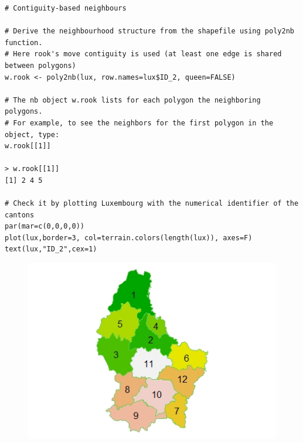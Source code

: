 \documentclass[12pt]{beamer}
\begin{document}
\begin{frame} [fragile]
\begin{tiny}
\begin{verbatim}
# Contiguity-based neighbours

# Derive the neighbourhood structure from the shapefile using poly2nb function.
# Here rook's move contiguity is used (at least one edge is shared between polygons)
w.rook <- poly2nb(lux, row.names=lux$ID_2, queen=FALSE)

# The nb object w.rook lists for each polygon the neighboring polygons.
# For example, to see the neighbors for the first polygon in the object, type:
w.rook[[1]]

> w.rook[[1]]
[1] 2 4 5

# Check it by plotting Luxembourg with the numerical identifier of the cantons
par(mar=c(0,0,0,0))
plot(lux,border=3, col=terrain.colors(length(lux)), axes=F)
text(lux,"ID_2",cex=1)

\end{verbatim}
\end{tiny}
\vspace{-10pt}
\begin{figure}
\includegraphics[scale=0.55]{Lux_map.jpeg}
\end{figure}
\end{frame}
\end{document}
